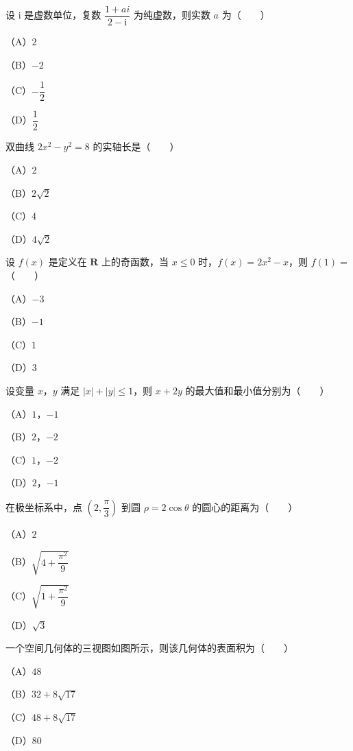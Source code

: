 \begin{question}
设 $\mathrm i$ 是虚数单位，复数 $\dfrac{1+ai}{2-\mathrm i}$ 为纯虚数，则实数 $a$ 为\mbox{（　　）}

（A）$2$

（B）$-2$

（C）$-\dfrac12$

（D）$\dfrac12$

\end{question}
\begin{question}
双曲线 $2x^2-y^2=8$ 的实轴长是\mbox{（　　）}

（A）$2$

（B）$2\sqrt2$

（C）$4$

（D）$4\sqrt2$

\end{question}
\begin{question}
设 $f(x)$ 是定义在 $\mathbf R$ 上的奇函数，当 $x\leqslant 0$ 时，$f(x)=2x^2-x$，则 $f(1)=$\mbox{（　　）}

（A）$-3$

（B）$-1$

（C）$1$

（D）$3$

\end{question}
\begin{question}
设变量 $x$，$y$ 满足 $|x|+|y|\leqslant 1$，则 $x+2y$ 的最大值和最小值分别为\mbox{（　　）}

（A）$1$，$-1$

（B）$2$，$-2$

（C）$1$，$-2$

（D）$2$，$-1$

\end{question}
\begin{question}
在极坐标系中，点 $\left(2,\dfrac{\pi}{3}\right)$ 到圆 $\rho=2\cos\theta$ 的圆心的距离为\mbox{（　　）}

（A）$2$

（B）$\sqrt{4+\dfrac{\pi^2}{9}}$

（C）$\sqrt{1+\dfrac{\pi^2}{9}}$

（D）$\sqrt3$

\Needspace{0.4\textheight}
\end{question}
\begin{question}
一个空间几何体的三视图如图所示，则该几何体的表面积为\mbox{（　　）}

（A）$48$

（B）$32+8\sqrt{17}$

（C）$48+8\sqrt{17}$

（D）$80$
\nopagebreak[4]
\begin{center}\end{center}
\nopagebreak[4]
\end{question}
